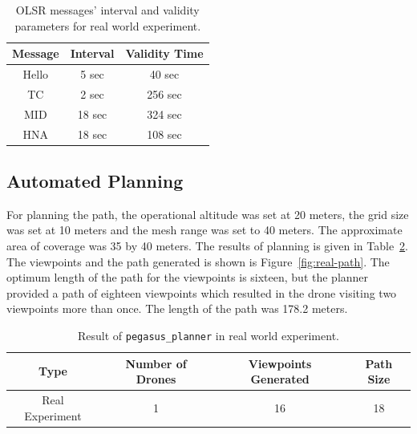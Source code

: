 \begin{table}[h!]
	\caption[OLSR messsages' interval and validity parameters for real world experiment.]{OLSR messages' interval and validity parameters for real world experiment.}
	\begin{center}
		\begin{tabular}{c|c|c}
			\hline Message & Interval & Validity Time \\ \hline \hline
			Hello & 5 sec &  40 sec \\ \hline
			TC & 2 sec & 256 sec \\ \hline 
			MID & 18 sec & 324 sec  \\ \hline 
			HNA & 18 sec & 108 sec \\ \hline
		\end{tabular}
	\end{center}
	\label{tab:gcs-olsr-setting}
\end{table}


\subsection{Automated Planning}

For planning the path, the operational altitude was set at 20 meters, the grid size was set at 10 meters and the mesh range was set to 40 meters. The approximate area of coverage was 35 by 40 meters. The results of planning is given in Table~\ref{tab:real-world-planning}. The viewpoints and the path generated is shown is Figure~\ref{fig:real-path}. The optimum length of the path for the viewpoints is sixteen, but the planner provided a path of eighteen viewpoints which resulted in the drone visiting two viewpoints more than once. The length of the path was 178.2 meters.
\begin{table}[t]
	\caption[Result of \texttt{pegasus\_planner} in real world experiment.]{\small Result of \texttt{pegasus\_planner} in real world experiment.}
	\begin{center}
		\begin{tabular}{c|c|c|c}
			\hline Type & Number of Drones & Viewpoints Generated & Path Size \\ \hline \hline
			Real Experiment & 1 & 16 & 18 \\ \hline
		\end{tabular}
	\end{center}
	\label{tab:real-world-planning}
\end{table} 



